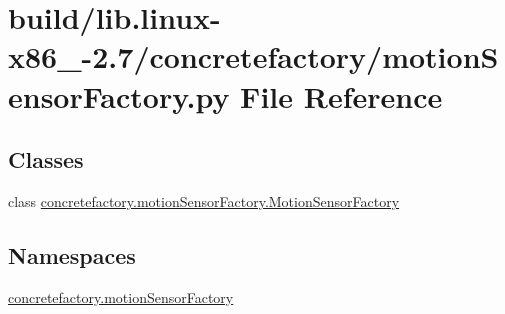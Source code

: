 \hypertarget{build_2lib_8linux-x86__64-2_87_2concretefactory_2motionSensorFactory_8py}{}\section{build/lib.linux-\/x86\+\_-\/2.7/concretefactory/motion\+Sensor\+Factory.py File Reference}
\label{build_2lib_8linux-x86__64-2_87_2concretefactory_2motionSensorFactory_8py}
\subsection*{Classes}
\begin{DoxyCompactItemize}
\item 
class \hyperlink{classconcretefactory_1_1motionSensorFactory_1_1MotionSensorFactory}{concretefactory.\+motion\+Sensor\+Factory.\+Motion\+Sensor\+Factory}
\end{DoxyCompactItemize}
\subsection*{Namespaces}
\begin{DoxyCompactItemize}
\item 
 \hyperlink{namespaceconcretefactory_1_1motionSensorFactory}{concretefactory.\+motion\+Sensor\+Factory}
\end{DoxyCompactItemize}
